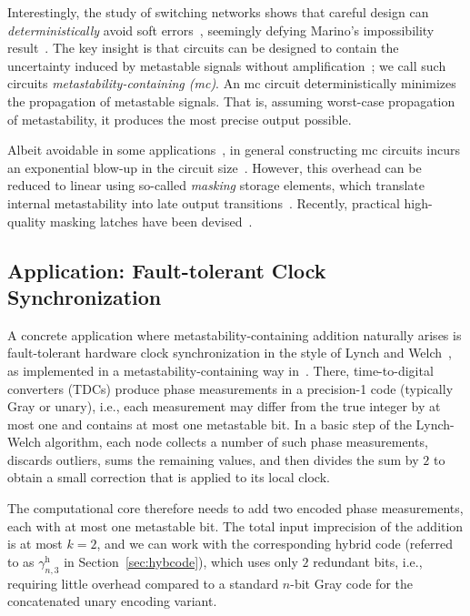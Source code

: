 \documentclass[9pt,journal,compsoc]{IEEEtran}
\theoremstyle{remark}
\newcommand{\gHyb}[1]{\gamma_{#1}^{\operatorname{h}}}
\begin{document}
Interestingly, the study of switching networks shows that careful design
  can \emph{deterministically} avoid soft errors~\cite{huffman57design}, seemingly defying Marino's impossibility result~\cite{marino1977effect}. 
The key insight is that circuits can be designed to contain the uncertainty induced by
  metastable signals without amplification~\cite{friedrichs18containing};
  we call such circuits \emph{metastability-containing (mc)}.
An mc circuit deterministically minimizes the propagation of metastable signals.
That is, assuming worst-case propagation of metastability, it produces the most precise output possible.

Albeit avoidable in some applications~\cite{bund20optimal,fuegger17aware}, in general constructing mc circuits incurs an 
  exponential blow-up in the circuit size~\cite{ikenmeyer18complexity}.
  However, this overhead can be reduced to linear using so-called \emph{masking} storage elements, which translate internal metastability into late output transitions~\cite{friedrichs18containing}.
  Recently, practical high-quality masking latches have been devised~\cite{srinivas25latch}. 

\subsection{Application: Fault-tolerant Clock Synchronization}
A concrete application where metastability-containing addition naturally
arises is fault-tolerant hardware clock synchronization in the style of
Lynch and Welch~\cite{welch88fault_tolerant}, as implemented in a metastability-containing way in~\cite{friedrichs18containing}. There, time-to-digital
converters (TDCs) produce phase measurements in a precision-1 code
(typically Gray or unary), i.e., each measurement may differ from the
true integer by at most one and contains at most one metastable bit.
In a basic step of the Lynch-Welch algorithm, each node collects a
number of such phase measurements, discards outliers,
sums the remaining values, and then divides the sum by $2$ to obtain a small correction that is applied to its local clock.

The computational core therefore needs to add two encoded
phase measurements, each with at most one metastable bit. The total
input imprecision of the addition is at most $k=2$, and we can work with the corresponding hybrid code (referred to as $\gHyb{n,3}$ in Section~\ref{sec:hybcode}), which uses only $2$ redundant bits, i.e., requiring little overhead compared to
a standard $n$-bit Gray code for the concatenated unary encoding variant.
\end{document}
